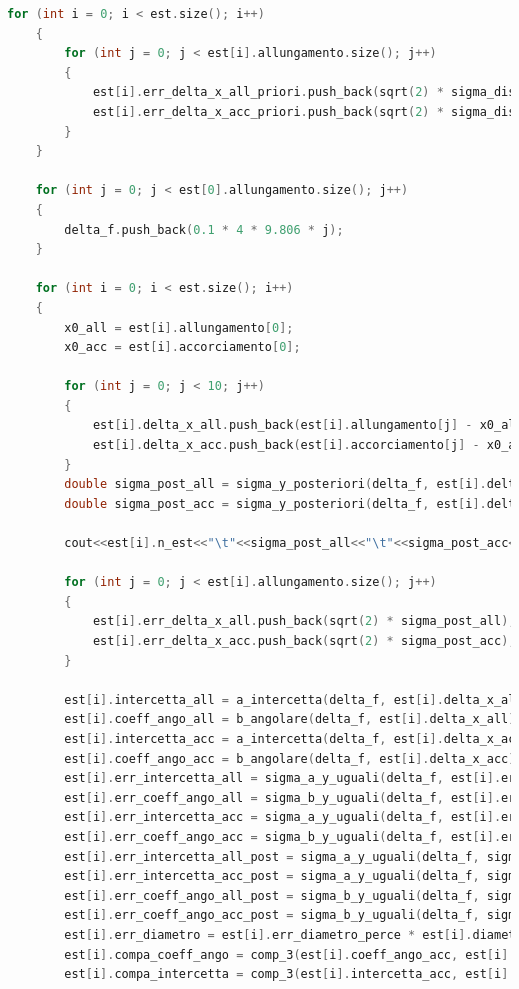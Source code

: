 \documentclass[a4paper,11pt,oneside]{article}
\begin{document}
\begin{lstlisting}[language=C++, label=lst:seconda_parte, caption=seconda\_parte]
	for (int i = 0; i < est.size(); i++) 
	{
		for (int j = 0; j < est[i].allungamento.size(); j++)
		{
			est[i].err_delta_x_all_priori.push_back(sqrt(2) * sigma_dist_uni(5.0, 1));
			est[i].err_delta_x_acc_priori.push_back(sqrt(2) * sigma_dist_uni(5.0, 1));
		}
	} 

	for (int j = 0; j < est[0].allungamento.size(); j++)
	{
		delta_f.push_back(0.1 * 4 * 9.806 * j);
	}

	for (int i = 0; i < est.size(); i++) 
	{
		x0_all = est[i].allungamento[0];
		x0_acc = est[i].accorciamento[0];

		for (int j = 0; j < 10; j++) 
		{
			est[i].delta_x_all.push_back(est[i].allungamento[j] - x0_all);
			est[i].delta_x_acc.push_back(est[i].accorciamento[j] - x0_acc);
		}
		double sigma_post_all = sigma_y_posteriori(delta_f, est[i].delta_x_all);
		double sigma_post_acc = sigma_y_posteriori(delta_f, est[i].delta_x_acc);

		cout<<est[i].n_est<<"\t"<<sigma_post_all<<"\t"<<sigma_post_acc<<"\t"<<sqrt(2) * sigma_dist_uni(5.0, 1)<<"\t"<<sqrt(2) * sigma_dist_uni(10.0, 1)<<endl;

		for (int j = 0; j < est[i].allungamento.size(); j++)
		{
			est[i].err_delta_x_all.push_back(sqrt(2) * sigma_post_all); 
			est[i].err_delta_x_acc.push_back(sqrt(2) * sigma_post_acc);
		}

		est[i].intercetta_all = a_intercetta(delta_f, est[i].delta_x_all);				  
		est[i].coeff_ango_all = b_angolare(delta_f, est[i].delta_x_all);				  
		est[i].intercetta_acc = a_intercetta(delta_f, est[i].delta_x_acc);				  
		est[i].coeff_ango_acc = b_angolare(delta_f, est[i].delta_x_acc);				  
		est[i].err_intercetta_all = sigma_a_y_uguali(delta_f, est[i].err_delta_x_all[0]); 
		est[i].err_coeff_ango_all = sigma_b_y_uguali(delta_f, est[i].err_delta_x_all[0]); 
		est[i].err_intercetta_acc = sigma_a_y_uguali(delta_f, est[i].err_delta_x_acc[0]); 
		est[i].err_coeff_ango_acc = sigma_b_y_uguali(delta_f, est[i].err_delta_x_acc[0]); 
		est[i].err_intercetta_all_post = sigma_a_y_uguali(delta_f, sigma_post_all);		  
		est[i].err_intercetta_acc_post = sigma_a_y_uguali(delta_f, sigma_post_acc);
		est[i].err_coeff_ango_all_post = sigma_b_y_uguali(delta_f, sigma_post_all);
		est[i].err_coeff_ango_acc_post = sigma_b_y_uguali(delta_f, sigma_post_acc);
		est[i].err_diametro = est[i].err_diametro_perce * est[i].diametro;
		est[i].compa_coeff_ango = comp_3(est[i].coeff_ango_acc, est[i].coeff_ango_all, est[i].err_coeff_ango_acc_post, est[i].err_coeff_ango_all_post); 
		est[i].compa_intercetta = comp_3(est[i].intercetta_acc, est[i].intercetta_all, est[i].err_intercetta_acc_post, est[i].err_intercetta_all_post);


\end{lstlisting}
\end{document}
